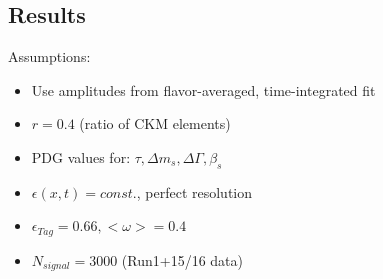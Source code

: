 %
%

\clearpage
\subsection{Results}

Assumptions:
	\begin{itemize}	
		\item Use amplitudes from flavor-averaged, time-integrated fit
		\item $r = 0.4$ (ratio of CKM elements) 
		\item PDG values for: $\tau,\Delta m_s, \Delta \Gamma, \beta_s$
		\item $\epsilon(x,t) = const.$, perfect resolution  
		\item $\epsilon_{Tag} = 0.66, <\omega> = 0.4 $   
		\item $N_{signal} = 3000$ (Run1+15/16 data)		 
	\end{itemize}
	
